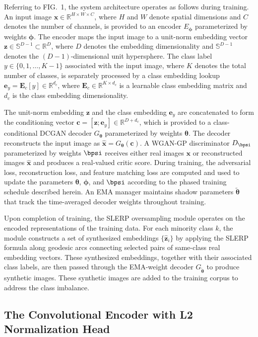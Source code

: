 \documentclass[12pt,letterpaper]{article}
\newcommand{\bz}{\mathbf{z}}
\newcommand{\bx}{\mathbf{x}}
\newcommand{\bc}{\mathbf{c}}
\newcommand{\btheta}{\bm{\theta}}
\newcommand{\bphi}{\bm{\phi}}
\newcommand{\RR}{\mathbb{R}}
\begin{document}
Referring to FIG.\ 1, the system architecture operates as follows during
training. An input image $\bx \in \RR^{H \times W \times C}$, where $H$ and
$W$ denote spatial dimensions and $C$ denotes the number of channels, is
provided to an encoder $E_{\bphi}$ parameterized by weights $\bphi$. The
encoder maps the input image to a unit-norm embedding vector $\bz \in
\mathbb{S}^{D-1} \subset \RR^D$, where $D$ denotes the embedding dimensionality
and $\mathbb{S}^{D-1}$ denotes the $(D-1)$-dimensional unit hypersphere. The
class label $y \in \{0, 1, \ldots, K-1\}$ associated with the input image,
where $K$ denotes the total number of classes, is separately processed by a
class embedding lookup $\bm{e}_y = \mathbf{E}_c[y] \in \RR^{d_c}$, where
$\mathbf{E}_c \in \RR^{K \times d_c}$ is a learnable class embedding matrix
and $d_c$ is the class embedding dimensionality.

The unit-norm embedding $\bz$ and the class embedding $\bm{e}_y$ are
concatenated to form the conditioning vector $\bc = [\bz; \bm{e}_y] \in
\RR^{D + d_c}$, which is provided to a class-conditional DCGAN decoder
$G_{\btheta}$ parameterized by weights $\btheta$. The decoder reconstructs the
input image as $\hat{\bx} = G_{\btheta}(\bc)$. A WGAN-GP discriminator
$D_{\bpsi}$ parameterized by weights $\bpsi$ receives either real images $\bx$
or reconstructed images $\hat{\bx}$ and produces a real-valued critic score.
During training, the adversarial loss, reconstruction loss, and feature matching
loss are computed and used to update the parameters $\btheta$, $\bphi$, and
$\bpsi$ according to the phased training schedule described herein. An EMA
manager maintains shadow parameters $\tilde{\btheta}$ that track the
time-averaged decoder weights throughout training.

Upon completion of training, the SLERP oversampling module operates on the
encoded representations of the training data. For each minority class $k$, the
module constructs a set of synthesized embeddings $\{\hat{\bz}_i\}$ by applying
the SLERP formula along geodesic arcs connecting selected pairs of same-class
real embedding vectors. These synthesized embeddings, together with their
associated class labels, are then passed through the EMA-weight decoder
$G_{\tilde{\btheta}}$ to produce synthetic images. These synthetic images are
added to the training corpus to address the class imbalance.

\subsection{The Convolutional Encoder with L2 Normalization Head}
\end{document}
